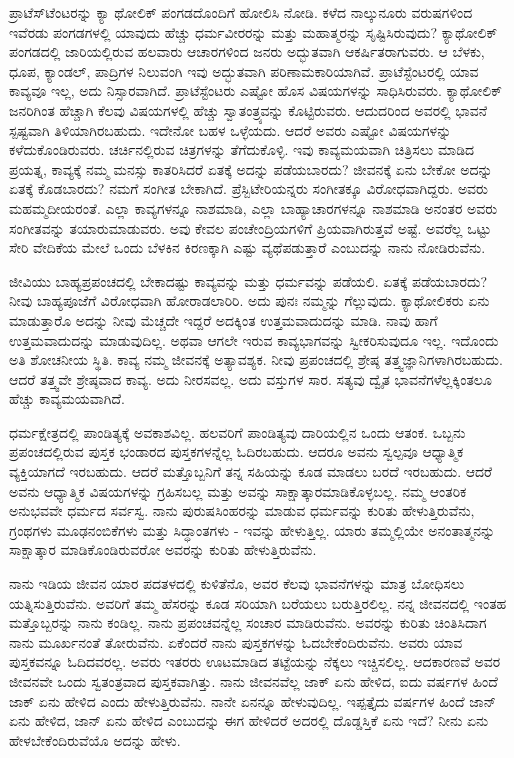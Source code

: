 ಪ್ರಾಟೆಸ್‌ಟೆಂಟರನ್ನು ಕ್ಯಾ ಥೋಲಿಕ್ ಪಂಗಡದೊಂದಿಗೆ ಹೋಲಿಸಿ ನೋಡಿ. ಕಳೆದ ನಾಲ್ಕುನೂರು ವರುಷಗಳಿಂದ ಇವೆರಡು ಪಂಗಡಗಳಲ್ಲಿ ಯಾವುದು ಹೆಚ್ಚು ಧರ್ಮವೀರರನ್ನು ಮತ್ತು ಮಹಾತ್ಮರನ್ನು ಸೃಷ್ಟಿಸಿರುವುದು? ಕ್ಯಾಥೋಲಿಕ್ ಪಂಗಡದಲ್ಲಿ ಜಾರಿಯಲ್ಲಿರುವ ಹಲವಾರು ಆಚಾರಗಳಿಂದ ಜನರು ಅದ್ಭುತವಾಗಿ ಆಕರ್ಷಿತರಾಗುವರು. ಆ ಬೆಳಕು, ಧೂಪ, ಕ್ಯಾಂಡಲ್, ಪಾದ್ರಿಗಳ ನಿಲುವಂಗಿ ಇವು ಅದ್ಭುತವಾಗಿ ಪರಿಣಾಮಕಾರಿಯಾಗಿವೆ. ಪ್ರಾಟೆಸ್ಟೆಂಟರಲ್ಲಿ ಯಾವ ಕಾವ್ಯವೂ ಇಲ್ಲ, ಅದು ನಿಸ್ಸಾರವಾಗಿದೆ. ಪ್ರಾಟೆಸ್ಟೆಂಟರು ಎಷ್ಟೋ ಹೊಸ ವಿಷಯಗಳನ್ನು ಸಾಧಿಸಿರುವರು. ಕ್ಯಾಥೋಲಿಕ್ ಜನರಿಗಿಂತ ಹೆಚ್ಚಾಗಿ ಕೆಲವು ವಿಷಯಗಳಲ್ಲಿ ಹೆಚ್ಚು ಸ್ವಾತಂತ್ರ್ಯವನ್ನು ಕೊಟ್ಟಿರುವರು. ಆದುದರಿಂದ ಅವರಲ್ಲಿ ಭಾವನೆ ಸ್ಪಷ್ಟವಾಗಿ ತಿಳಿಯಾಗಿರಬಹುದು. ಇದೇನೋ ಬಹಳ ಒಳ್ಳೆಯದು. ಆದರೆ ಅವರು ಎಷ್ಟೋ ವಿಷಯಗಳನ್ನು ಕಳೆದುಕೊಂಡಿರುವರು. ಚರ್ಚಿನಲ್ಲಿರುವ ಚಿತ್ರಗಳನ್ನು ತೆಗೆದುಕೊಳ್ಳಿ. ಇವು ಕಾವ್ಯಮಯವಾಗಿ ಚಿತ್ರಿಸಲು ಮಾಡಿದ ಪ್ರಯತ್ನ, ಕಾವ್ಯಕ್ಕೆ ನಮ್ಮ ಮನಸ್ಸು ಕಾತರಿಸಿದರೆ ಏತಕ್ಕೆ ಅದನ್ನು ಪಡೆಯಬಾರದು? ಜೀವನಕ್ಕೆ ಏನು ಬೇಕೋ ಅದನ್ನು ಏತಕ್ಕೆ ಕೊಡಬಾರದು? ನಮಗೆ ಸಂಗೀತ ಬೇಕಾಗಿದೆ. ಪ್ರೆಸ್ಬಿಟೇರಿಯನ್ನರು ಸಂಗೀತಕ್ಕೂ ವಿರೋಧವಾಗಿದ್ದರು. ಅವರು ಮಹಮ್ಮದೀಯರಂತೆ. ಎಲ್ಲಾ ಕಾವ್ಯಗಳನ್ನೂ ನಾಶಮಾಡಿ, ಎಲ್ಲಾ ಬಾಹ್ಯಾಚಾರಗಳನ್ನೂ ನಾಶಮಾಡಿ ಅನಂತರ ಅವರು ಸಂಗೀತವನ್ನು ತಯಾರುಮಾಡುವರು. ಅವು ಕೇವಲ ಪಂಚೇಂದ್ರಿಯಗಳಿಗೆ ಪ್ರಿಯವಾಗಿರುತ್ತವೆ ಅಷ್ಟೆ. ಅವರೆಲ್ಲ ಒಟ್ಟು ಸೇರಿ ವೇದಿಕೆಯ ಮೇಲೆ ಒಂದು ಬೆಳಕಿನ ಕಿರಣಕ್ಕಾಗಿ ಎಷ್ಟು ವ್ಯಥೆಪಡುತ್ತಾರೆ ಎಂಬುದನ್ನು ನಾನು ನೋಡಿರುವೆನು.

ಜೀವಿಯು ಬಾಹ್ಯಪ್ರಪಂಚದಲ್ಲಿ ಬೇಕಾದಷ್ಟು ಕಾವ್ಯವನ್ನು ಮತ್ತು ಧರ್ಮವನ್ನು ಪಡೆಯಲಿ. ಏತಕ್ಕೆ ಪಡೆಯಬಾರದು? ನೀವು ಬಾಹ್ಯಪೂಜೆಗೆ ವಿರೋಧವಾಗಿ ಹೋರಾಡಲಾರಿರಿ. ಅದು ಪುನಃ ನಮ್ಮನ್ನು ಗೆಲ್ಲುವುದು. ಕ್ಯಾಥೋಲಿಕರು ಏನು ಮಾಡುತ್ತಾರೊ ಅದನ್ನು ನೀವು ಮೆಚ್ಚದೇ ಇದ್ದರೆ ಅದಕ್ಕಿಂತ ಉತ್ತಮವಾದುದನ್ನು ಮಾಡಿ. ನಾವು ಹಾಗೆ ಉತ್ತಮವಾದುದನ್ನು ಮಾಡುವುದಿಲ್ಲ. ಅಥವಾ ಆಗಲೇ ಇರುವ ಕಾವ್ಯಭಾಗವನ್ನು ಸ್ವೀಕರಿಸುವುದೂ ಇಲ್ಲ. ಇದೊಂದು ಅತಿ ಶೋಚನೀಯ ಸ್ಥಿತಿ. ಕಾವ್ಯ ನಮ್ಮ ಜೀವನಕ್ಕೆ ಅತ್ಯಾವಶ್ಯಕ. ನೀವು ಪ್ರಪಂಚದಲ್ಲಿ ಶ್ರೇಷ್ಠ ತತ್ತ್ವಜ್ಞಾನಿಗಳಾಗಿರಬಹುದು. ಆದರೆ ತತ್ತ್ವವೇ ಶ್ರೇಷ್ಠವಾದ ಕಾವ್ಯ. ಅದು ನೀರಸವಲ್ಲ. ಅದು ವಸ್ತುಗಳ ಸಾರ. ಸತ್ಯವು ದ್ವೈತ ಭಾವನೆಗಳೆಲ್ಲಕ್ಕಿಂತಲೂ ಹೆಚ್ಚು ಕಾವ್ಯಮಯವಾಗಿದೆ.

ಧರ್ಮಕ್ಷೇತ್ರದಲ್ಲಿ ಪಾಂಡಿತ್ಯಕ್ಕೆ ಅವಕಾಶವಿಲ್ಲ. ಹಲವರಿಗೆ ಪಾಂಡಿತ್ಯವು ದಾರಿಯಲ್ಲಿನ ಒಂದು ಆತಂಕ. ಒಬ್ಬನು ಪ್ರಪಂಚದಲ್ಲಿರುವ ಪುಸ್ತಕ ಭಂಡಾರದ ಪುಸ್ತಕಗಳನ್ನೆಲ್ಲ ಓದಿರಬಹುದು. ಆದರೂ ಅವನು ಸ್ವಲ್ಪವೂ ಆಧ್ಯಾತ್ಮಿಕ ವ್ಯಕ್ತಿಯಾಗದೆ ಇರಬಹುದು. ಆದರೆ ಮತ್ತೊಬ್ಬನಿಗೆ ತನ್ನ ಸಹಿಯನ್ನು ಕೂಡ ಮಾಡಲು ಬರದೆ ಇರಬಹುದು. ಆದರೆ ಅವನು ಆಧ್ಯಾತ್ಮಿಕ ವಿಷಯಗಳನ್ನು ಗ್ರಹಿಸಬಲ್ಲ ಮತ್ತು ಅವನ್ನು ಸಾಕ್ಷಾತ್ಕಾರಮಾಡಿಕೊಳ್ಳಬಲ್ಲ. ನಮ್ಮ ಆಂತರಿಕ ಅನುಭವವೇ ಧರ್ಮದ ಸರ್ವಸ್ವ. ನಾನು ಪುರುಷಸಿಂಹರನ್ನು ಮಾಡುವ ಧರ್ಮವನ್ನು ಕುರಿತು ಹೇಳುತ್ತಿರುವೆನು, ಗ್ರಂಥಗಳು ಮೂಢನಂಬಿಕೆಗಳು ಮತ್ತು ಸಿದ್ಧಾಂತಗಳು - ಇವನ್ನು ಹೇಳುತ್ತಿಲ್ಲ. ಯಾರು ತಮ್ಮಲ್ಲಿಯೇ ಅನಂತಾತ್ಮನನ್ನು ಸಾಕ್ಷಾತ್ಕಾರ ಮಾಡಿಕೊಂಡಿರುವರೋ ಅವರನ್ನು ಕುರಿತು ಹೇಳುತ್ತಿರುವೆನು.

ನಾನು ಇಡಿಯ ಜೀವನ ಯಾರ ಪದತಳದಲ್ಲಿ ಕುಳಿತೆನೊ, ಅವರ ಕೆಲವು ಭಾವನೆಗಳನ್ನು ಮಾತ್ರ ಬೋಧಿಸಲು ಯತ್ನಿಸುತ್ತಿರುವೆನು. ಅವರಿಗೆ ತಮ್ಮ ಹೆಸರನ್ನು ಕೂಡ ಸರಿಯಾಗಿ ಬರೆಯಲು ಬರುತ್ತಿರಲಿಲ್ಲ. ನನ್ನ ಜೀವನದಲ್ಲಿ ಇಂತಹ ಮತ್ತೊಬ್ಬರನ್ನು ನಾನು ಕಂಡಿಲ್ಲ. ನಾನು ಪ್ರಪಂಚವನ್ನೆಲ್ಲ ಸಂಚಾರ ಮಾಡಿರುವೆನು. ಅವರನ್ನು ಕುರಿತು ಚಿಂತಿಸಿದಾಗ ನಾನು ಮೂರ್ಖನಂತೆ ತೋರುವೆನು. ಏಕೆಂದರೆ ನಾನು ಪುಸ್ತಕಗಳನ್ನು ಓದಬೇಕೆಂದಿರುವೆನು. ಅವರು ಯಾವ ಪುಸ್ತಕವನ್ನೂ ಓದಿದವರಲ್ಲ. ಅವರು ಇತರರು ಊಟಮಾಡಿದ ತಟ್ಟೆಯನ್ನು ನೆಕ್ಕಲು ಇಚ್ಚಿಸಲಿಲ್ಲ. ಆದಕಾರಣವೆ ಅವರ ಜೀವನವೇ ಒಂದು ಸ್ವತಂತ್ರವಾದ ಪುಸ್ತಕವಾಗಿತ್ತು. ನಾನು ಜೀವನವೆಲ್ಲ ಜಾಕ್ ಏನು ಹೇಳಿದ, ಐದು ವರ್ಷಗಳ ಹಿಂದೆ ಜಾಕ್ ಏನು ಹೇಳಿದ ಎಂದು ಹೇಳುತ್ತಿರುವೆನು. ನಾನೇ ಏನನ್ನೂ ಹೇಳುವುದಿಲ್ಲ. ಇಪ್ಪತ್ತೈದು ವರ್ಷಗಳ ಹಿಂದೆ ಜಾನ್ ಏನು ಹೇಳಿದ, ಜಾನ್ ಏನು ಹೇಳಿದ ಎಂಬುದನ್ನು ಈಗ ಹೇಳಿದರೆ ಅದರಲ್ಲಿ ದೊಡ್ಡಸ್ತಿಕೆ ಏನು ಇದೆ? ನೀನು ಏನು ಹೇಳಬೇಕೆಂದಿರುವೆಯೊ ಅದನ್ನು ಹೇಳು.

